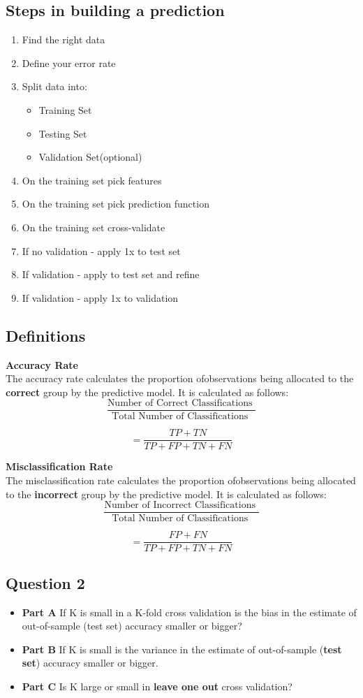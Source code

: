 \documentclass[caret-main.tex]{subfiles}
\begin{document}
\subsection*{Steps in building a prediction}
\begin{enumerate}
\item Find the right data
\item Define your error rate
\item Split data into:
\begin{itemize}
\item Training Set
\item Testing Set
\item Validation Set(optional)
\end{itemize}
\item On the training set pick features
\item On the training set pick prediction function
\item On the training set cross-validate

\item If no validation - apply 1x to test set
\item If validation - apply to test set and refine
\item If validation - apply 1x to validation
\end{enumerate}
\subsection{Definitions}
\textbf{Accuracy Rate}\\
The accuracy rate calculates the proportion ofobservations being allocated to the \textbf{correct} group by the predictive model. It is calculated as follows:
\[ \frac{
\mbox{Number of Correct Classifications }}{\mbox{Total Number of Classifications }} \]

\[ = \frac{TP + TN}{TP+FP+TN+FN}\]


\noindent \textbf{Misclassification Rate}\\
The misclassification rate calculates the proportion ofobservations being allocated to the \textbf{incorrect} group by the predictive model. It is calculated as follows:
\[ \frac{
\mbox{Number of Incorrect Classifications }}{\mbox{Total Number of Classifications }} \]

\[ = \frac{FP + FN}{TP+FP+TN+FN}\]

\subsection*{Question 2}
\begin{itemize}
\item \textbf{Part A} If K is small in a K-fold cross validation is the bias in the estimate of
out-of-sample (test set) accuracy smaller or bigger? 
\item \textbf{Part B} If K is small is the
variance in the estimate of out-of-sample (\textbf{test set}) accuracy smaller or bigger.
\item \textbf{Part C} Is K large or small in \textbf{leave one out} cross validation?
\end{itemize}
\end{document}
